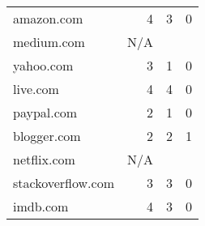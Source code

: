 \begin{table}
\begin{tabular}{lrrr}
    amazon.com        & 4                                                                       & 3                                                                                        & 0                                                                                      \\
    medium.com        & N/A                                                                     &                                                                                          &                                                                                        \\
    yahoo.com         & 3                                                                       & 1                                                                                        & 0                                                                                      \\
    live.com          & 4                                                                       & 4                                                                                        & 0                                                                                      \\
    paypal.com        & 2                                                                       & 1                                                                                        & 0                                                                                      \\
    blogger.com       & 2                                                                       & 2                                                                                        & 1                                                                                      \\
    netflix.com       & N/A                                                                     &                                                                                          &                                                                                        \\
    stackoverflow.com & 3                                                                       & 3                                                                                        & 0                                                                                      \\
    imdb.com          & 4                                                                       & 3                                                                                        & 0                                                                                      \\

\end{tabular}
\end{table}
